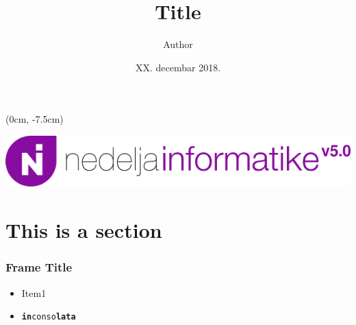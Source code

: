 \documentclass[11pt, compress]{beamer}
\title{Title}
\author[\textcolor{white}{Author}]{Author}
\date{XX. decembar 2018.}
\institute{Matematička gimnazija\\[0.5ex]\textcolor{blockcol}{\scshape Nedelja$_\text{informatike}^{\text{v5.0}}$}}
\begin{document}
{
	\begin{frame}
		\titlepage
		\begin{textblock*}{\linewidth}(0cm, -7.5cm)
		\begin{center}
			\includegraphics[width=0.6\linewidth]{logo-v5.png}
		\end{center}	
		\end{textblock*}
	\end{frame}
}


\section{This is a section}

\begin{frame}
    \frametitle{Frame Title}
    \begin{itemize}
        \item Item1
        \item \texttt{\textbf{in}conso\textbf{lata}}
    \end{itemize}
\end{frame}
\end{document}
